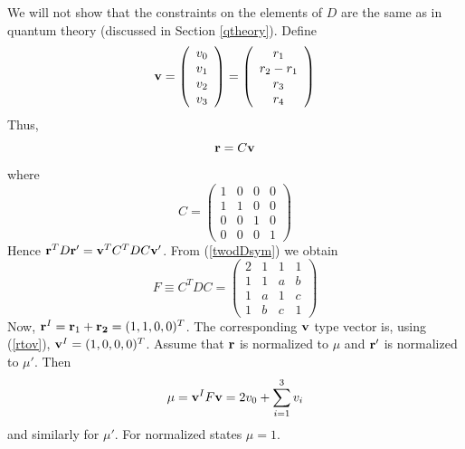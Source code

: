 \documentclass[10pt,twocolumn]{article}
\begin{document}
We will not show that the constraints on the elements of $D$ are the
same as in quantum theory (discussed in Section \ref{qtheory}).
Define
\begin{equation}\label{rtov}
{\bf v} = \left( \begin{array}{c} v_0 \\ v_1 \\ v_2 \\ v_3 \end{array}
\right) = \left( \begin{array}{c} r_1 \\ r_2-r_1 \\ r_3 \\ r_4 \end{array}
\right) \end{equation}
Thus,
\begin{equation}
{\bf r} = C {\bf v}
\end{equation}
where
\begin{equation}
         C=\left( \begin{array}{cccc} 1 & 0 & 0 & 0 \\
                                     1 & 1 & 0 & 0 \\
                                     0 & 0 & 1 & 0 \\
                                     0 & 0 & 0 & 1  \end{array}
                                     \right)
\end{equation}
Hence ${\bf r}^T D {\bf r}' = {\bf v}^T C^TDC {\bf v}'$.  From
(\ref{twodDsym}) we obtain
\begin{equation}
F\equiv C^TDC =\left( \begin{array}{cccc} 2 &  1 &  1 & 1  \\
                             1 &  1 &   a  &  b  \\
                             1&  a &  1 &  c  \\
                            1 &  b &  c&  1   \end{array} \right)
\end{equation}
Now, ${\bf r}^I={\bf r}_1+{\bf r_2}=(1, 1, 0, 0)^T$.
The corresponding ${\bf v}$ type
vector is, using (\ref{rtov}), ${\bf v}^I= (1 , 0, 0, 0)^T$.  Assume
that ${\bf r}$ is normalized to $\mu$ and ${\bf r}'$ is normalized to
$\mu'$.  Then
\begin{equation}\label{vnorm}
\mu = {\bf v}^I F {\bf v} = 2v_0 + \sum_{i=1}^3 v_i
\end{equation}
and similarly for $\mu'$.  For normalized states $\mu=1$.
\end{document}
